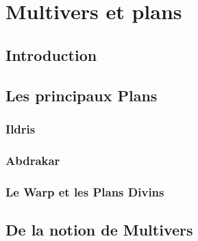 \chapter{Multivers et plans}
\section{Introduction}
\section{Les principaux Plans}
\subsection{Ildris}
\subsection{Abdrakar}
\subsection{Le Warp et les Plans Divins}
\section{De la notion de Multivers}
